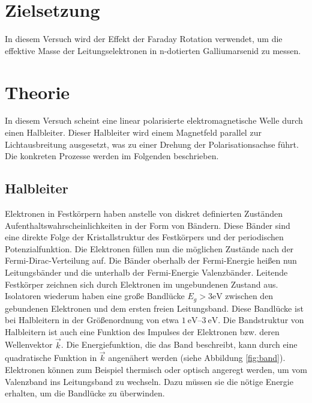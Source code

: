 \section{Zielsetzung}
In diesem Versuch wird der Effekt der Faraday Rotation verwendet, um die
effektive Masse der Leitungselektronen in n-dotierten Galliumarsenid zu messen.

\section{Theorie}
In diesem Versuch scheint eine linear polarisierte elektromagnetische Welle
durch einen Halbleiter. Dieser Halbleiter wird einem Magnetfeld parallel zur
Lichtausbreitung ausgesetzt, was zu einer Drehung der Polarisationsachse führt.
Die konkreten Prozesse werden im Folgenden beschrieben.

\subsection{Halbleiter \cite[][Kap. 14]{book:expi3}}

Elektronen in Festkörpern haben anstelle von diskret definierten Zuständen
Aufenthaltswahrscheinlichkeiten in der Form von Bändern. Diese Bänder sind eine
direkte Folge der Kristallstruktur des Festkörpers und der periodischen
Potenzialfunktion.
Die Elektronen füllen nun die möglichen Zustände nach der
Fermi-Dirac-Verteilung auf. Die Bänder oberhalb der Fermi-Energie heißen nun
Leitungsbänder und die unterhalb der Fermi-Energie Valenzbänder. Leitende
Festkörper zeichnen sich durch Elektronen im ungebundenen Zustand aus.
Isolatoren wiederum haben eine große Bandlücke $E_g > 3 \unit{\eV}$
\cite{web:Bandlücke} zwischen den gebundenen Elektronen und dem ersten freien
Leitungsband. Diese Bandlücke ist bei Halbleitern in der Größenordnung von etwa
$\qtyrange{1}{3}{\eV}$\cite{web:Bandlücke}. Die Bandstruktur von Halbleitern
ist auch eine Funktion des Impulses der Elektronen bzw. deren Wellenvektor
$\vec{k}$. Die Energiefunktion, die das Band beschreibt, kann durch eine
quadratische Funktion in $\vec{k}$ angenähert werden (siehe Abbildung
\ref{fig:band}). Elektronen können zum Beispiel thermisch oder optisch angeregt
werden, um vom Valenzband ins Leitungsband zu wechseln. Dazu müssen sie die
nötige Energie erhalten, um die Bandlücke zu überwinden.

